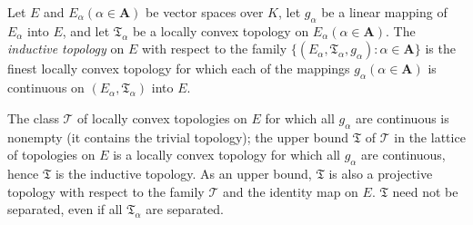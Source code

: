 Let $E$ and $E_{\alpha} (\alpha \in \mathbf{A})$ be vector spaces over $K$, let $g_{\alpha}$ be a linear mapping of $E_{\alpha}$ into $E$, and let $\mathfrak{T}_{\alpha}$ be a locally convex topology on $E_{\alpha} (\alpha \in \mathbf{A})$. The \textit{inductive topology} on $E$ with respect to the family $\{(E_{\alpha}, \mathfrak{T}_{\alpha}, g_{\alpha}): \alpha \in \mathbf{A}\}$ is the finest locally convex topology for which each of the mappings $g_{\alpha} (\alpha \in \mathbf{A})$ is continuous on $(E_{\alpha}, \mathfrak{T}_{\alpha})$ into $E$.

The class $\mathcal{T}$ of locally convex topologies on $E$ for which all $g_{\alpha}$ are continuous is nonempty (it contains the trivial topology); the upper bound $\mathfrak{T}$ of $\mathcal{T}$ in the lattice of topologies on $E$ is a locally convex topology for which all $g_{\alpha}$ are continuous, hence $\mathfrak{T}$ is the inductive topology. As an upper bound, $\mathfrak{T}$ is also a projective topology with respect to the family $\mathcal{T}$ and the identity map on $E$. $\mathfrak{T}$ need not be separated, even if all $\mathfrak{T}_{\alpha}$ are separated.
